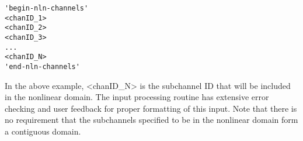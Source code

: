 {
\singlespace
\begin{verbatim}
'begin-nln-channels'
<chanID_1>
<chanID_2>
<chanID_3>
...
<chanID_N>
'end-nln-channels'
\end{verbatim}
}

In the above example, <chanID\_N> is the subchannel ID that will be included in the nonlinear domain.
The input processing routine has extensive error checking and user feedback for proper formatting of this input.
Note that there is no requirement that the subchannels specified to be in the nonlinear domain form a contiguous domain.


